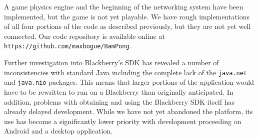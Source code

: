 \documentclass{sig-alternate}
\begin{document}

A game physics engine and the beginning of the networking system have been
implemented, but the game is not yet playable.  We have rough
implementations of all four portions of the code as described previously,
but they are not yet well connected.  Our code repository is available
online at \texttt{https://github.com/maxbogue/BamPong}.

Further investigation into Blackberry's SDK has revealed a number of
inconsistencies with standard Java including the complete lack of the
\texttt{java.net} and \texttt{java.nio} packages.  This means that larger
portions of the application would have to be rewritten to run on a
Blackberry than originally anticipated.  In addition, problems with
obtaining and using the Blackberry SDK itself has already delayed
development.  While we have not yet abandoned the platform, its use has
become a significantly lower priority with development proceeding on
Android and a desktop application.



\balance
\end{document}
